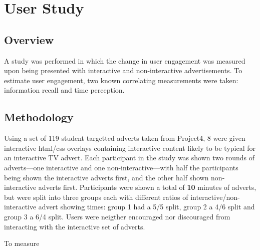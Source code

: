 \section{User Study}
	\subsection{Overview}
	A study was performed in which the change in user engagement was measured upon being presented with interactive and non-interactive advertisements. To estimate user engagement, two known correlating measurements were taken: information recall\cite{} and time perception\cite{yahoo-intrusive-advertising}.

	\subsection{Methodology}
	Using a set of 119 student targetted adverts taken from Project4, 8 were given interactive html/css overlays containing interactive content likely to be typical for an interactive TV advert. Each participant in the study was shown two rounds of adverts---one interactive and one non-interactive---with half the participants being shown the interactive adverts first, and the other half shown non-interactive adverts first. Participants were shown a total of
	\textbf{10}
	minutes of adverts, but were split into three groups each with different ratios of interactive/non-interactive advert showing times: group 1 had a 5/5 split, group 2 a 4/6 split and group 3 a 6/4 split. Users were neigther encouraged nor discouraged from interacting with the interactive set of adverts.

	To measure 

